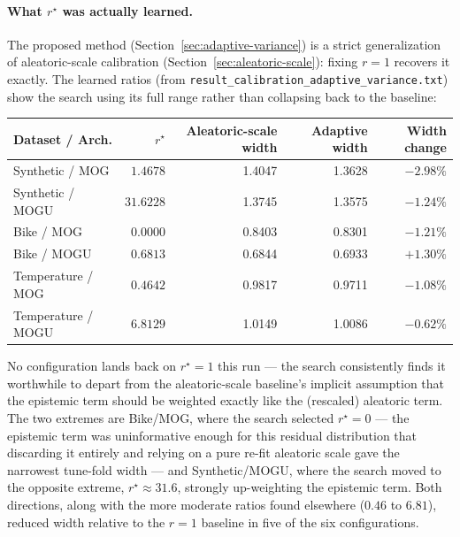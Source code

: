 \documentclass[11pt]{article}
\begin{document}
\paragraph{What $r^\star$ was actually learned.} The proposed method
(Section~\ref{sec:adaptive-variance}) is a strict generalization of aleatoric-scale calibration
(Section~\ref{sec:aleatoric-scale}): fixing $r=1$ recovers it exactly. The learned ratios (from
\texttt{result\_calibration\_adaptive\_variance.txt}) show the search using its full range rather
than collapsing back to the baseline:
\begin{center}
\begin{tabular}{@{}lrrrr@{}}
\toprule
\textbf{Dataset / Arch.} & \textbf{$r^\star$} & \textbf{Aleatoric-scale width} & \textbf{Adaptive
width} & \textbf{Width change} \\
\midrule
Synthetic / MOG    & $1.4678$  & 1.4047 & 1.3628 & $-2.98\%$ \\
Synthetic / MOGU   & $31.6228$ & 1.3745 & 1.3575 & $-1.24\%$ \\
Bike / MOG         & $0.0000$  & 0.8403 & 0.8301 & $-1.21\%$ \\
Bike / MOGU        & $0.6813$  & 0.6844 & 0.6933 & $+1.30\%$ \\
Temperature / MOG  & $0.4642$  & 0.9817 & 0.9711 & $-1.08\%$ \\
Temperature / MOGU & $6.8129$  & 1.0149 & 1.0086 & $-0.62\%$ \\
\bottomrule
\end{tabular}
\end{center}
No configuration lands back on $r^\star=1$ this run — the search consistently finds it worthwhile
to depart from the aleatoric-scale baseline's implicit assumption that the epistemic term should be
weighted exactly like the (rescaled) aleatoric term. The two extremes are Bike/MOG, where the
search selected $r^\star=0$ — the epistemic term was uninformative enough for this residual
distribution that discarding it entirely and relying on a pure re-fit aleatoric scale gave the
narrowest tune-fold width — and Synthetic/MOGU, where the search moved to the opposite extreme,
$r^\star \approx 31.6$, strongly up-weighting the epistemic term. Both directions, along with the
more moderate ratios found elsewhere ($0.46$ to $6.81$), reduced width relative to the $r=1$
baseline in five of the six configurations.
\end{document}
